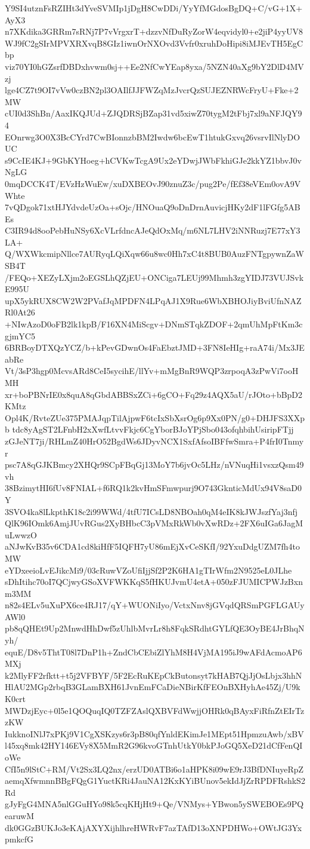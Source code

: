 Y9SI4utznFsRZIHt3dYveSVMIp1jDgH8CwDDi/YyYfMGdosBgDQ+C/vG+1X+AyX3
n7XKdika3GRRm7sRNj7P7vVrgxrT+dzzvNfDuRyZorW4eqvidyl0+e2jiP4yyUV8
WJ9fC2gSIrMPVXRXvqB8GIz1iwnOrNXOvd3Vvfr0xruhDoHipi8iMJEvTH5EgCbp
viz70YI0hGZsrfDBDxhvwm0sj++Ee2NfCwYEap8yxa/5NZN40aXg9bY2DlD4MVzj
lge4CZ7t9OI7vVw0czBN2pl3OAIlfJJFWZqMzJvcrQzSUJEZNRWcFryU+Fke+2MW
cUI0d3ShBn/AaxIKQJUd+ZJQDRSjBZap31vd5xiwZ70tygM2tFbj7xl9aNFJQY94
EOnrwg3O0X3BcCYrd7CwBIonnzbBM2Iwdw6bcEwT1htukGxvq26vsrvIlNlyDOUC
s9CcIE4KJ+9GbKYHoeg+hCVKwTcgA9Ux2eYDwjJWbFkhiGJe2kkYZ1bbvJ0vNgLG
0mqDCCK4T/EVzHzWuEw/xuDXBEOvJ90znuZ3c/pug2Pe/fEf38eVEm0ovA9VWhte
7vQDgok71xtHJYdvdeUzOa+sOjc/HNOuaQ9oDnDrnAuvicjHKy2dF1lFGfg5ABEs
C3IR94d8ooPebHuNSy6XcVLrfdncAJeQdOxMq/m6NL7LHV2iNNRuzj7E77xY3LA+
Q/WXWkcmipNllce7AURyqLQiXqw66u8wc0Hh7xC4t8BUB0AuzFNTgpywnZaWSB4T
/FEQo+XEZyLXjm2oEGSLhQZjEU+ONCiga7LEUj99Mhmh3zgYIDJ73VUJSvkE995U
upX5ykRUX8CW2W2PVafJqMPDFN4LPqAJ1X9Rue6WbXBHOJiyBviUfnNAZRl0At26
+NIwAzoD0oFB2lk1kpB/F16XN4MiScgv+DNmSTqkZDOF+2qmUhMpFtKm3cgjmYC5
6BRBoyDTXQzYCZ/b+kPevGDwnOs4FaEbztJMD+3FN8IeHIg+raA74i/Mx3JEabRe
Vt/3sP3hgp0McvsARd8CeI5sycihE/llYv+mMgBnR9WQP3zrpoqA3zPwVi7ooHMH
xr+boPBNrIE0x8quA8qGbdABBSxZCi+6gCO+Fq29z4AQX5aU/rJOto+bBpD2KMtz
Opl4K/RvteZUe375PMAJqpTilAjpwF6tcIxSbXsrOg6p9Xx0PN/g0+DHJFS3XXpb
tdc8yAgST2LFnbH2xXwfLtvvFkjc6CgYborBJoYPjSbo043ofqhbihUsiripFTjj
zGJeNT7ji/RHLmZ40HrO52BgdWs6JDyvNCX1SxfAfsoIBFfwSmra+P4frI0Tnmyr
psc7A8qGJKBmcy2XHQr9SCpFBqGj13MoY7b6jvOc5LHz/nVNuqHi1vsxzQsm49vh
38BzimytHI6fUv8FNIAL+f6RQ1k2kvHmSFmwpurj9O743GknticMdUx94V8saD0Y
3SVO4ka8lLkpthK18c2i99WWd/4tfU7ICsLD8NBOah0qM4eIK8kJWJszfYaj3nfj
QlK96IOmk6AmjJUvRGus2XyBHbcC3pVMxRkWb0vXwRDz+2FX6uIGa6JagMuLwwzO
aNJwKvB35v6CDA1cd8kiHfF5IQFH7yU86mEjXvCeSKfI/92YxuDdgUZM7fh4toMW
eYDxeeioLvEJikcMi9/03cRuwVZoUfiIjjSf2P2K6HA1gTIrWfm2N9525eL0JLhe
sDhItihc70oI7QCjwyGSoXVFWKKqS5fHKUJvmU4etA+050zFJUMICPWJzBxnm3MM
n82s4ELv5uXuPX6ce4RJ17/qY+WUONiIyo/VctxNnv8jGVqdQRSmPGFLGAUyAWl0
pb8qQHEt9Up2MnwdHhDwf5zUhlbMvrLr8h8FqkSRdhtGYLfQE3OyBE4JrBhqNyh/
equE/D8v5ThtT08l7DnP1h+ZndCbCEbiZlYhM8H4VjMA195iJ9wAFdAcmoAP6MXj
k2MlyFF2rfktt+t5j2VFBYF/5F2EcRuKEpCkButonsyt7kHAB7QjJjOsLbjx3hhN
HlAU2MGp2rbqB3GLamBXH61JvnEmFCaDieNBirKfFEOnBXHyhAe45Zj/U9kK0crt
MWDzjEyc+0l5e1QOQuqIQ0TZFZAslQXBVFdWwjjOHRk0qBAyxFiRfnZtEIrTzzKW
IukknoINlJ7xPKj9V1CgXSKzys6r3pB80qfYnldEKimJe1MEpt51HpmzuAwb/xBV
l45xq8mk42HY146EVy8X5MmR2G96kvoGTnhUtkY0bkPJoGQ5XeD21dCfFenQIoWe
CfI5n9lStC+RM/Vt2Sx3LQ2nx/erzUD0ATBi6o1aHPK8i09wE9rJ3BfDNIuyeRpZ
aemqXfwmnnBBgFQgG1YuctKRi4JauNA12KxKYiBUnov5ekIdJjZrRPDFRshkS2Rd
gJyFgG4MNA5nlGGuHYo98k5cqKHjHt9+Qe/VNMys+YBwon5ySWEBOEs9PQearuwM
dk0GGzBUKJo3eKAjAXYXijhlhreHWRvF7azTAfD13oXNPDHWo+OWtJG3YxpmkcfG
